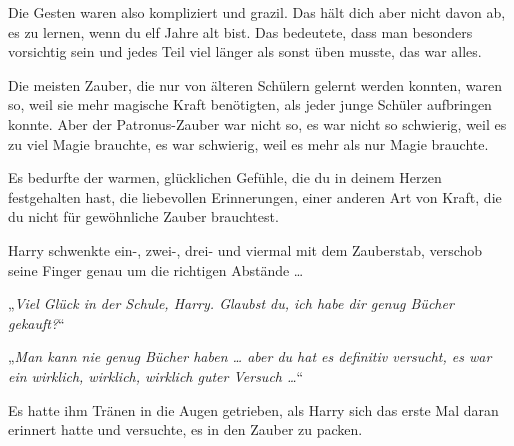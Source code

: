 Die Gesten waren also kompliziert und grazil. Das hält dich aber nicht davon ab, es zu lernen, wenn du elf Jahre alt bist. Das bedeutete, dass man besonders vorsichtig sein und jedes Teil viel länger als sonst üben musste, das war alles.

Die meisten Zauber, die nur von älteren Schülern gelernt werden konnten, waren so, weil sie mehr magische Kraft benötigten, als jeder junge Schüler aufbringen konnte. Aber der Patronus-Zauber war nicht so, es war nicht so schwierig, weil es zu viel Magie brauchte, es war schwierig, weil es mehr als nur Magie brauchte.

Es bedurfte der warmen, glücklichen Gefühle, die du in deinem Herzen festgehalten hast, die liebevollen Erinnerungen, einer anderen Art von Kraft, die du nicht für gewöhnliche Zauber brauchtest.

Harry schwenkte ein-, zwei-, drei- und viermal mit dem Zauberstab, verschob seine Finger genau um die richtigen Abstände …

„\emph{Viel Glück in der Schule, Harry. Glaubst du, ich habe dir genug Bücher gekauft?}“

„\emph{Man kann nie genug Bücher haben … aber du hat es \emph{definitiv} versucht, es war ein wirklich, wirklich, wirklich guter Versuch …}“

Es hatte ihm Tränen in die Augen getrieben, als Harry sich das erste Mal daran erinnert hatte und versuchte, es in den Zauber zu packen.

